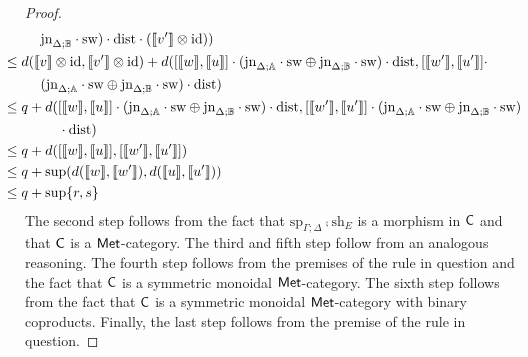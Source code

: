 \begin{proof}
\begin{align*}
    & \hspace{7pt}  \text{jn}_{\Delta;\typeB}\comp \sw) \comp \dist \comp (\llbracket v'\rrbracket \otimes \text{id}) )\\
    & \hspace{-20pt} \leq  d(\llbracket v\rrbracket \otimes \text{id}, \llbracket v'\rrbracket \otimes \text{id}) +  d( [\llbracket w\rrbracket ,\llbracket u\rrbracket] \comp (\text{jn}_{\Delta;\typeA}\comp \sw \oplus \text{jn}_{\Delta;\typeB}\comp \sw) \comp \dist,  [\llbracket w'\rrbracket ,\llbracket u'\rrbracket]\comp \\
    & \hspace{7pt} (\text{jn}_{\Delta;\typeA}\comp \sw \oplus \text{jn}_{\Delta;\typeB}\comp \sw) \comp \dist) \\
    & \hspace{-20pt} \leq  q +  d( [\llbracket w\rrbracket ,\llbracket u\rrbracket] \comp (\text{jn}_{\Delta;\typeA}\comp \sw \oplus \text{jn}_{\Delta;\typeB}\comp \sw) \comp \dist,  [\llbracket w'\rrbracket ,\llbracket u'\rrbracket] \comp (\text{jn}_{\Delta;\typeA}\comp \sw \oplus \text{jn}_{\Delta;\typeB}\comp \sw)  \\
    & \hspace{20pt} \comp \dist)\\
    &  \hspace{-20pt} \leq q +  d( [\llbracket w\rrbracket ,\llbracket u\rrbracket],  [\llbracket w'\rrbracket ,\llbracket u'\rrbracket]) \\
    & \hspace{-20pt}  \leq q + \sup(d( \llbracket w\rrbracket , \llbracket w' \rrbracket), d( \llbracket u\rrbracket , \llbracket u' \rrbracket)) \\
    & \hspace{-20pt} \leq  q + \sup \{r, s\} \\
  \end{align*}
  The second step follows from the fact that $\text{sp}_{\Gamma;\Delta} \comp \text{sh}_{E}$  is a morphism in $\mathsf{C}$  and that $\mathsf{C}$ is a $\mathsf{Met}$-category.  The third and fifth step follow from an analogous reasoning. The fourth step follows from the premises of the rule in question and the fact that $\mathsf{C}$ is a symmetric monoidal $\mathsf{Met}$-category. The sixth step follows from the fact that $\mathsf{C}$ is a symmetric monoidal $\mathsf{Met}$-category with binary coproducts. Finally, the last step follows from the premise of the rule in question.

\end{proof}

